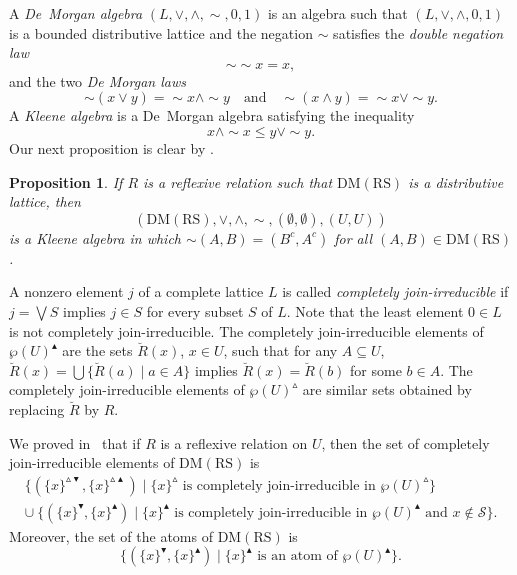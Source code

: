 \documentclass[11pt,a4paper]{amsart}
\newcommand{\UP}{\blacktriangle}
\newcommand{\DOWN}{\blacktriangledown}
\newcommand{\Up}{\vartriangle}
\theoremstyle{plain}
\newtheorem{proposition}[theorem]{Proposition}
\theoremstyle{definition}
\theoremstyle{remark}
\numberwithin{equation}{section}
\begin{document}
A \emph{De~Morgan algebra} $(L,\vee,\wedge,{\sim},0,1)$ is
an algebra such that $(L,\vee,\wedge,0,1)$  
is a bounded distributive lattice and the negation $\sim$ satisfies the \emph{double negation law}
\[ {\sim} {\sim} x = x,\] 
and the two \emph{De Morgan laws} 
\[ {\sim} (x \vee y) = {\sim} x \wedge {\sim} y  
\quad \text{and} \quad 
{\sim} (x \wedge y) = {\sim} x \vee {\sim} y .  \]
A \emph{Kleene algebra} is a De~Morgan algebra satisfying  the inequality
\begin{equation} \label{Eq:Kleene}\tag{K}
x \wedge {\sim} x \leq y \vee {\sim} y.
\end{equation}
Our next proposition is clear by \cite[Lemma~2.1]{JarRad23}.

\begin{proposition} \label{Prop:Kleene}
If $R$ is a reflexive relation such that $\mathrm{DM(RS)}$ is
a distributive lattice, then
\[ (\mathrm{DM(RS)},\vee,\wedge,{\sim},(\emptyset,\emptyset), (U,U) ) \]
is a Kleene algebra in which ${\sim}(A,B) = (B^c, A^c)$ for all
$(A,B) \in  \mathrm{DM(RS)}$.
\end{proposition}

A nonzero element $j$ of a complete lattice $L$ is called 
\emph{completely join-irreducible} if $j = \bigvee S$ implies $j \in S$ 
for every subset $S$ of $L$.
Note that the least element $0 \in L$ is not completely join-irreducible.
The completely join-irreducible elements of $\wp(U)^\UP$ are the
sets $\breve{R}(x)$, $x \in U$, such that for any $A \subseteq U$, 
$\breve{R}(x) = \bigcup \{ \breve{R}(a) \mid a \in A\}$ implies 
$\breve{R}(x) = \breve{R}(b)$ for some $b \in A$. The completely
join-irreducible elements of $\wp(U)^\Up$ are similar sets obtained
by replacing $\breve{R}$ by $R$.

We proved in~\cite{JarRad25} that if $R$ is a reflexive relation on $U$, 
then the set of completely join-irreducible
elements of $\mathrm{DM(RS)}$ is
\begin{gather} \label{eq:Join1}
\{ (\{x\}^{\Up \DOWN},\{x\}^{\Up \UP}) \mid 
\text{$\{x\}^\Up$ is completely join-irreducible in $\wp(U)^\Up$} \} \\
\label{eq:Join2}
\cup \  \{ (\{x\}^\DOWN,\{x\}^\UP) \mid 
\text{$\{x\}^\UP$ is completely join-irreducible in $\wp(U)^\UP$ 
and $x \notin \mathcal{S}$} \}. 
\end{gather}
Moreover, the set of the atoms of $\mathrm{DM(RS)}$ is 
\begin{equation} \label{eq:atoms}
\{ (\{x\}^\DOWN,\{x\}^\UP ) \mid 
\text{$\{x\}^\UP$ is an atom of $\wp(U)^\UP$} \}.
\end{equation}
\end{document}
